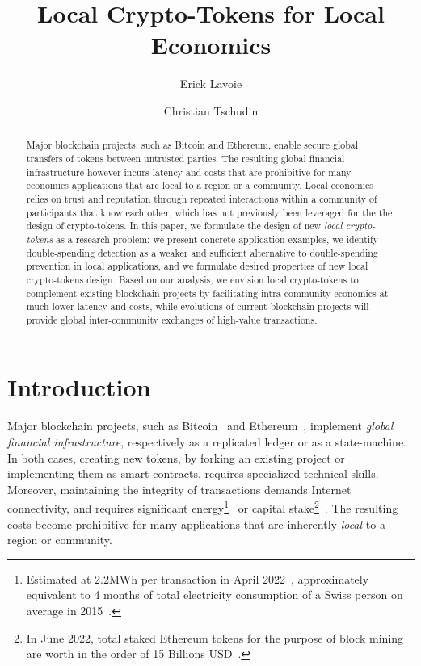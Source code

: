 \documentclass[sigplan,screen,10pt]{acmart}
\begin{document}
\title{Local Crypto-Tokens for Local Economics}

\author{Erick Lavoie}

\author{Christian Tschudin}


\begin{abstract}
Major blockchain projects, such as Bitcoin and Ethereum, enable secure global transfers of tokens between untrusted parties. The resulting global financial infrastructure however incurs latency and costs that are prohibitive for many economics applications that are local to a region or a community. Local economics relies on trust and reputation through repeated interactions within a community of participants that know each other, which has not previously been leveraged for the the design of crypto-tokens. In this paper, we formulate the design of new \textit{local crypto-tokens} as a research problem: we present concrete application examples, we identify double-spending detection as a weaker and sufficient alternative to double-spending prevention in local applications, and we formulate desired properties of new local crypto-tokens design. Based on our analysis, we envision local crypto-tokens to complement existing blockchain projects by facilitating intra-community economics at much lower latency and costs, while evolutions of current blockchain projects will provide global inter-community exchanges of high-value transactions.
\end{abstract}

\maketitle

\section{Introduction}

Major blockchain projects, such as Bitcoin~\cite{nakamoto2008bitcoin} and Ethereum~\cite{buterin2014next}, implement \textit{global financial infrastructure}, respectively as a replicated ledger or as a state-machine. In both cases, creating new tokens, by forking an existing project or implementing them as smart-contracts, requires specialized technical skills. Moreover, maintaining the integrity of transactions demands Internet connectivity, and requires significant energy\footnote{Estimated at 2.2MWh per transaction in April 2022~\cite{bitcoin-transaction-energy}, approximately equivalent to 4 months of total electricity consumption of a Swiss person on average in 2015~\cite{average-energy-consumption-per-capita-ch}.}~\cite{vranken2017sustainability,sedlmeir2020energy} or capital stake\footnote{In June 2022, total staked Ethereum tokens for the purpose of block mining are worth in the order of 15 Billions USD~\cite{proof-of-stake}.}~\cite{sedlmeir2020energy}. The resulting costs become prohibitive for many applications that are inherently \textit{local} to a region or community.
\end{document}
